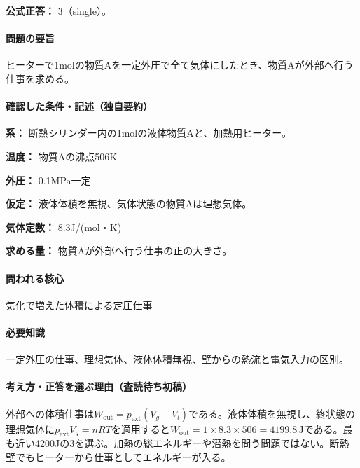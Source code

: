 \textbf{公式正答：} 3（single）。

\paragraph{問題の要旨} ヒーターで1molの物質Aを一定外圧で全て気体にしたとき、物質Aが外部へ行う仕事を求める。

\paragraph{確認した条件・記述（独自要約）}\mbox{}\par

\noindent\textbf{系：} 断熱シリンダー内の1molの液体物質Aと、加熱用ヒーター。\par

\noindent\textbf{温度：} 物質Aの沸点506K\par

\noindent\textbf{外圧：} 0.1MPa一定\par

\noindent\textbf{仮定：} 液体体積を無視、気体状態の物質Aは理想気体。\par

\noindent\textbf{気体定数：} 8.3J/(mol・K)\par

\noindent\textbf{求める量：} 物質Aが外部へ行う仕事の正の大きさ。\par

\paragraph{問われる核心} 気化で増えた体積による定圧仕事

\paragraph{必要知識} 一定外圧の仕事、理想気体、液体体積無視、壁からの熱流と電気入力の区別。

\paragraph{考え方・正答を選ぶ理由（査読待ち初稿）} 外部への体積仕事は\(W_{\mathrm{out}}=p_{\mathrm{ext}}(V_g-V_l)\)である。液体体積を無視し、終状態の理想気体に\(p_{\mathrm{ext}}V_g=nRT\)を適用すると\(W_{\mathrm{out}}=1\times8.3\times506=4199.8\,\mathrm{J}\)である。最も近い4200Jの3を選ぶ。加熱の総エネルギーや潜熱を問う問題ではない。断熱壁でもヒーターから仕事としてエネルギーが入る。

